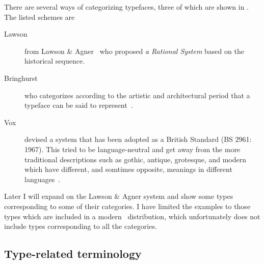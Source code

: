 \documentclass[10pt,a4paper,extrafontsizes]{memoir}
\begin{document}
\begin{paracol}{2}
\switchEng
    There are several ways of categorizing typefaces, three of which are
shown in . The listed schemes are
\begin{description}
\item[Lawson] from 
Lawson \& Agner~\autocite{LAWSONAGNER90} who proposed  
\emph{a Rational System} based on the historical sequence.
\item[Bringhurst] who categorizes according to the artistic and architectural
period that a typeface can be said to represent~\autocite{BRINGHURST99}.
\item[Vox] devised a system that has been adopted as a British Standard 
(BS 2961: 1967). This tried to be language-neutral and get away from
the more traditional descriptions such as gothic, antique, grotesque, and 
modern which have different, and somtimes opposite, meanings in different
languages~\autocite{MCLEAN80}.
\end{description}
Later I will expand on the Lawson \& Agner system and show some types 
corresponding to some of their categories. I have limited the examples to 
those types which are included in a modern \ltx\ 
distribution, 
which unfortunately does not include types corresponding to all the 
categories.
\end{paracol}


\subsection{Type-related terminology}
\end{document}
